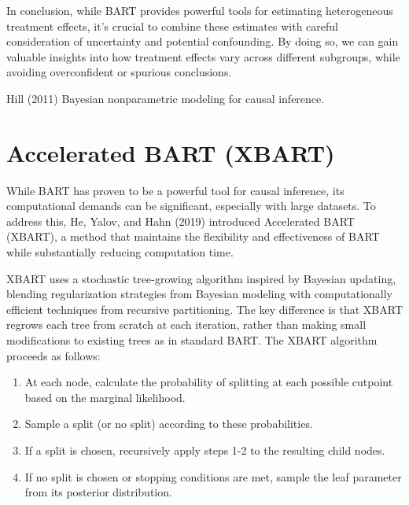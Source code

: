 \documentclass[
  letterpaper,
  DIV=11,
  numbers=noendperiod]{scrreprt}
\providecommand{\tightlist}{%
  \setlength{\itemsep}{0pt}\setlength{\parskip}{0pt}}\usepackage{longtable,booktabs,array}
\begin{document}
In conclusion, while BART provides powerful tools for estimating
heterogeneous treatment effects, it's crucial to combine these estimates
with careful consideration of uncertainty and potential confounding. By
doing so, we can gain valuable insights into how treatment effects vary
across different subgroups, while avoiding overconfident or spurious
conclusions.

\begin{tcolorbox}[enhanced jigsaw, colframe=quarto-callout-tip-color-frame, left=2mm, toprule=.15mm, colbacktitle=quarto-callout-tip-color!10!white, title=\textcolor{quarto-callout-tip-color}{\faLightbulb}\hspace{0.5em}{Learn more}, coltitle=black, rightrule=.15mm, leftrule=.75mm, colback=white, arc=.35mm, bottomtitle=1mm, bottomrule=.15mm, breakable, titlerule=0mm, opacitybacktitle=0.6, toptitle=1mm, opacityback=0]

Hill (2011) Bayesian nonparametric modeling for causal inference.

\end{tcolorbox}

\section{Accelerated BART (XBART)}\label{accelerated-bart-xbart}

While BART has proven to be a powerful tool for causal inference, its
computational demands can be significant, especially with large
datasets. To address this, He, Yalov, and Hahn (2019) introduced
Accelerated BART (XBART), a method that maintains the flexibility and
effectiveness of BART while substantially reducing computation time.

XBART uses a stochastic tree-growing algorithm inspired by Bayesian
updating, blending regularization strategies from Bayesian modeling with
computationally efficient techniques from recursive partitioning. The
key difference is that XBART regrows each tree from scratch at each
iteration, rather than making small modifications to existing trees as
in standard BART. The XBART algorithm proceeds as follows:

\begin{enumerate}
\def\labelenumi{\arabic{enumi}.}
\tightlist
\item
  At each node, calculate the probability of splitting at each possible
  cutpoint based on the marginal likelihood.
\item
  Sample a split (or no split) according to these probabilities.
\item
  If a split is chosen, recursively apply steps 1-2 to the resulting
  child nodes.
\item
  If no split is chosen or stopping conditions are met, sample the leaf
  parameter from its posterior distribution.
\end{enumerate}
\end{document}
